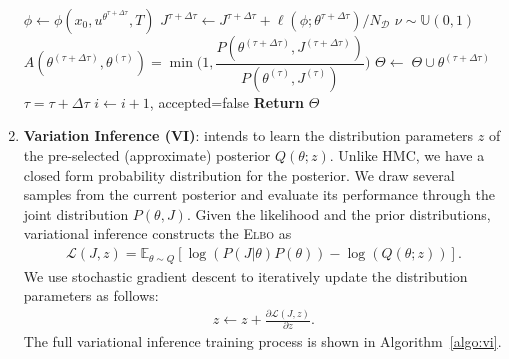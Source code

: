 \begin{enumerate}
\begin{algorithm}[H]
\begin{algorithmic}[1]
                    \State $\phi \leftarrow \phi(x_0, u^{\theta^{\tau + \Delta \tau}}, T) $
                    \State $J^{\tau + \Delta \tau}  \gets J^{\tau + \Delta \tau}  + \ell(\phi; \theta^{\tau + \Delta \tau})/N_{\mathcal{D}}$ 
                \EndFor
                \State $\nu \sim \mathbb{U}(0, 1)$
                \State $A(\theta^{(\tau + \Delta \tau)}, \theta^{(\tau)}) = \min \Biggl(1, \dfrac{P(\theta^{(\tau + \Delta \tau)}, J^{(\tau + \Delta \tau)})}{P(\theta^{(\tau)}, J^{(\tau)})} \Biggr)$
                    \State $\Theta \leftarrow \; \Theta \cup \theta^{(\tau + \Delta \tau)}$ 
                    \State $\tau = \tau + \Delta \tau$
                    \Else
                    \State $i \leftarrow i + 1$, accepted=false 
                \EndIf
            \EndWhile
        \EndWhile
        \State \textbf{Return} $\Theta$
        \end{algorithmic}
    \end{algorithm}

    \item \textbf{Variation Inference (VI)}: intends to learn the distribution
    parameters $z$ of the pre-selected (approximate) posterior $Q(\theta; z)$.
    Unlike HMC, we have a closed form probability distribution for the
    posterior. We draw several samples from the current posterior and evaluate
    its performance through the joint distribution $P(\theta, J)$. Given the
    likelihood and the prior distributions, variational inference constructs the
    \textsc{Elbo} as
    \begin{align}
        \mathcal{L}(J,z) = \mathbb{E}_{\theta \sim Q} \left[\log(P(J | \theta)P(\theta)) - \log(Q(\theta;z)) \right].    
        \label{eq:neuralpbc_elbo}    
    \end{align}
    We use stochastic gradient descent to iteratively update the distribution
    parameters as follows:
    \begin{align*}
      z \leftarrow z + \frac{ \partial \mathcal{L}(J,z)}{\partial z}.
    \end{align*}
    The full variational inference training process is shown in
    Algorithm~\eqref{algo:vi}.
    

\end{enumerate}
